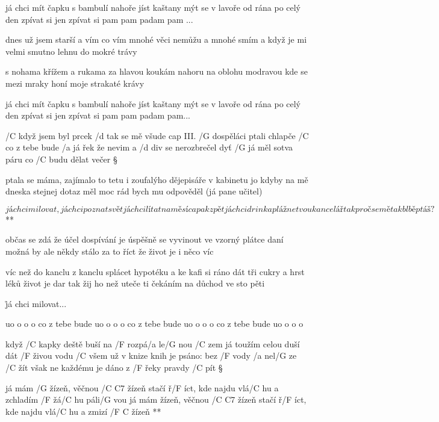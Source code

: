 já chci mít čapku s bambulí nahoře
jíst kaštany mýt se v lavoře
od rána po celý den
zpívat si jen
zpívat si pam pam padam pam ... \s

dnes už jsem starší a vím co vím
mnohé věci nemůžu a mnohé smím
a když je mi velmi smutno lehnu do mokré trávy \s

s nohama křížem a rukama za hlavou
koukám nahoru na oblohu modravou
kde se mezi mraky honí moje strakaté krávy \s

já chci mít čapku s bambulí nahoře
jíst kaštany mýt se v lavoře
od rána po celý den
zpívat si jen
zpívat si pam pam padam pam...




/C když jsem byl prcek /d tak se mě všude \hfill cap III.
/G dospěláci ptali chlapče /C co z tebe bude
/a já řek že nevim a /d div se nerozbrečel
dyť /G já měl sotva páru co /C budu dělat večer \S

ptala se máma, zajímalo to tetu
i zoufalýho dějepisáře v kabinetu
jo kdyby na mě dneska stejnej dotaz měl
moc rád bych mu odpověděl (já pane učitel)

\R  \[ já chci milovat, já chci poznat svět
    já chci lítat na měsíc a pak zpět
    já chci drink a pláž ne tvou kancelář
    tak proč se mě tak blbě ptáš? \] **

občas se zdá že účel dospívání
je úspěšně se vyvinout ve vzorný plátce daní
možná by ale někdy stálo za to říct
že život je i něco víc \s

víc než do kanclu z kanclu splácet hypotéku
a ke kafi si ráno dát tři cukry a hrst léků
život je dar tak žij ho než uteče ti
čekáním na důchod ve sto pěti

\r já chci milovat...

uo o o o co z tebe bude
uo o o o co z tebe bude
uo o o o co z tebe bude
uo o o o

\rr




když /C kapky deště buší na /F rozpá/a le/G nou /C zem
já toužím celou duší dát /F živou vodu /C všem
už v knize knih je psáno: bez /F vody /a nel/G ze /C žít
však ne každému je dáno z /F řeky pravdy /C pít \S

\R já mám /G žízeň, věčnou /{C C7} žízeň
   stačí ř/F íct, kde najdu vlá/C hu a zchladím /F žá/C hu páli/G vou
   já mám žízeň, věčnou /{C C7} žízeň
   stačí ř/F íct, kde najdu vlá/C hu a zmizí /{F C} žízeň **

